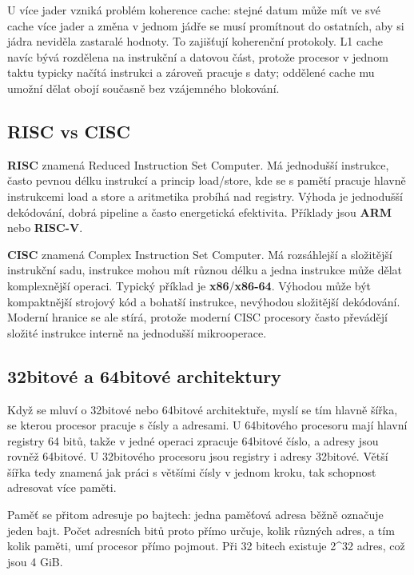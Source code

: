 U více jader vzniká problém koherence cache: stejné datum může mít ve své cache více jader a změna v jednom jádře se musí promítnout do ostatních, aby si jádra neviděla zastaralé hodnoty. To zajišťují koherenční protokoly. L1 cache navíc bývá rozdělena na instrukční a datovou část, protože procesor v jednom taktu typicky načítá instrukci a zároveň pracuje s daty; oddělené cache mu umožní dělat obojí současně bez vzájemného blokování.

\subsection*{RISC vs CISC}

\textbf{RISC} znamená Reduced Instruction Set Computer. Má jednodušší instrukce, často pevnou délku instrukcí a princip load/store, kde se s pamětí pracuje hlavně instrukcemi load a store a aritmetika probíhá nad registry. Výhoda je jednodušší dekódování, dobrá pipeline a často energetická efektivita. Příklady jsou \textbf{ARM} nebo \textbf{RISC-V}.

\textbf{CISC} znamená Complex Instruction Set Computer. Má rozsáhlejší a složitější instrukční sadu, instrukce mohou mít různou délku a jedna instrukce může dělat komplexnější operaci. Typický příklad je \textbf{x86}/\textbf{x86-64}. Výhodou může být kompaktnější strojový kód a bohatší instrukce, nevýhodou složitější dekódování. Moderní hranice se ale stírá, protože moderní CISC procesory často převádějí složité instrukce interně na jednodušší mikrooperace.

\subsection*{32bitové a 64bitové architektury}

Když se mluví o 32bitové nebo 64bitové architektuře, myslí se tím hlavně šířka, se kterou procesor pracuje s čísly a adresami. U 64bitového procesoru mají hlavní registry 64 bitů, takže v jedné operaci zpracuje 64bitové číslo, a adresy jsou rovněž 64bitové. U 32bitového procesoru jsou registry i adresy 32bitové. Větší šířka tedy znamená jak práci s většími čísly v jednom kroku, tak schopnost adresovat více paměti.

Paměť se přitom adresuje po bajtech: jedna paměťová adresa běžně označuje jeden bajt. Počet adresních bitů proto přímo určuje, kolik různých adres, a tím kolik paměti, umí procesor přímo pojmout. Při 32 bitech existuje 2\textasciicircum{}32 adres, což jsou 4 GiB.

